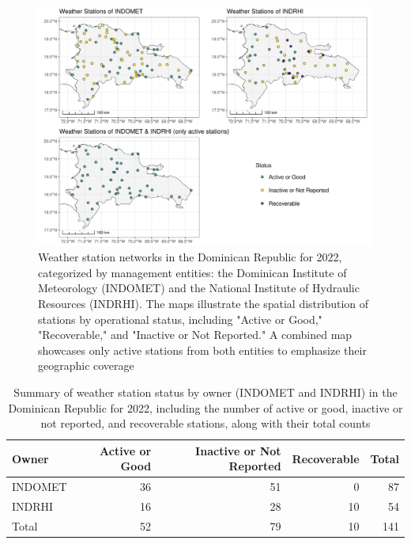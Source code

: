 \documentclass[spanish]{article}
\begin{document}
\begin{figure}

{\centering \includegraphics[width=1\linewidth]{figuras/ws_network_2022_grid2} 

}

\caption{Weather station networks in the Dominican Republic for 2022, categorized by management entities: the Dominican Institute of Meteorology (INDOMET) and the National Institute of Hydraulic Resources (INDRHI). The maps illustrate the spatial distribution of stations by operational status, including "Active or Good," "Recoverable," and "Inactive or Not Reported." A combined map showcases only active stations from both entities to emphasize their geographic coverage}\label{fig:ws_network_2022_grid2}
\end{figure}

\begin{table}[H]

\caption{\label{tab:summaryindometindrhi}Summary of weather station status by owner (INDOMET and INDRHI) in the Dominican Republic for 2022, including the number of active or good, inactive or not reported, and recoverable stations, along with their total counts}
\centering
\begin{tabular}[t]{lrrrr}
\toprule
Owner & Active or Good & Inactive or Not Reported & Recoverable & Total\\
\midrule
INDOMET & 36 & 51 & 0 & 87\\
INDRHI & 16 & 28 & 10 & 54\\
Total & 52 & 79 & 10 & 141\\
\bottomrule
\end{tabular}
\end{table}
\end{document}
